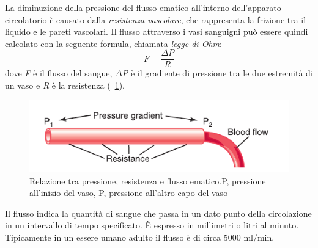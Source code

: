 La diminuzione della pressione del flusso ematico all'interno dell'apparato circolatorio è causato dalla \textit{resistenza vascolare}, che rappresenta la frizione tra il liquido e le pareti vascolari. Il flusso attraverso i vasi sanguigni può essere quindi calcolato con la seguente formula, chiamata \textit{legge di Ohm}:
\begin{equation}
	F=\frac{\Delta P}{R}
	\label{eq:OhmsLaw}
\end{equation}
dove \textit{F} è il flusso del sangue, \textit{$\Delta$P} è il gradiente di pressione tra le due estremità di un vaso e \textit{R} è la resistenza  (\Fig~\ref{fig:FlussoSangue}).
\begin{figure}[h]
	\centering
	\includegraphics[width=0.7\linewidth]{ImageFiles/Fotopletismografia/FlussoSangue}
	\caption{Relazione tra pressione, resistenza e flusso ematico.P, pressione all'inizio del vaso, P, pressione all'altro capo del vaso}
	\label{fig:FlussoSangue}
\end{figure}
\par Il flusso indica la quantità di sangue che passa in un dato punto della circolazione in un intervallo di tempo specificato. \`E espresso in millimetri o litri al minuto. Tipicamente in un essere umano adulto il flusso è di circa 5000 ml/min.

